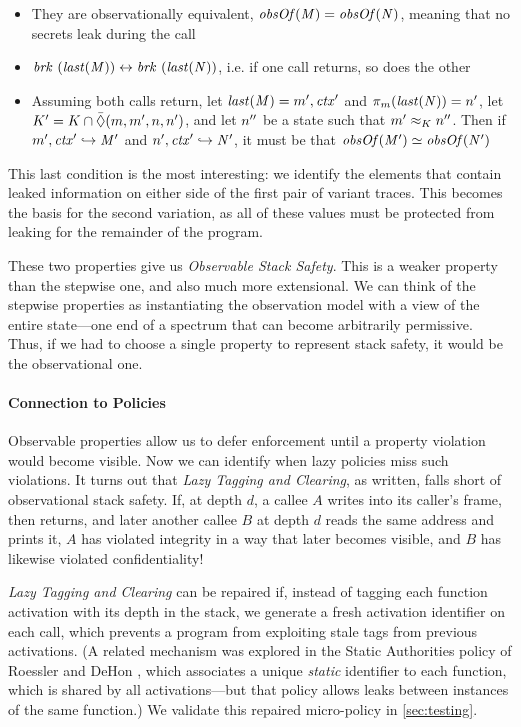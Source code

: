 \documentclass[10pt,conference]{ieeetran}%
\theoremstyle{definition}
\begin{document}
{\begin{itemize}
\item They are observationally equivalent, \(\mathit{obsOf}(\mathit{M}) = \mathit{obsOf}(\mathit{N})\),
  meaning that no secrets leak during the call
\item \(\mathit{brk} ~ (\mathit{last}(\mathit{M})) \leftrightarrow \mathit{brk} ~
(\mathit{last}(\mathit{N}))\), i.e. if one call returns, so does the other
\item Assuming both calls return, let \(\mathit{last}(\mathit{M}) = m',\mathit{ctx}'\)
  and \(\pi_m(\mathit{last}(\mathit{N})) = n'\),
  let \(K' = K \cap \bar{\Diamond}(m,m',n,n')\),
  and let \(n''\) be a state such that \(m' \approx_K n''\).
  Then if \(m',\mathit{ctx}' \hookrightarrow \mathit{M}'\) and
  \(n',\mathit{ctx}' \hookrightarrow \mathit{N}'\), it must be
  that \(\mathit{obsOf}(\mathit{M}') \simeq \mathit{obsOf}(\mathit{N}')\)
\end{itemize}

This last condition is the most interesting: we identify the elements that
contain leaked information on either side of the first pair of variant traces.
This becomes the basis for the second variation, as all of these values
must be protected from leaking for the remainder of the program.

These two properties give us
{\em Observable Stack Safety}. This is a weaker property
than the stepwise one, and also much more extensional.
We can think of the stepwise properties as instantiating
the observation model with a view of the entire state---one end of a
spectrum that can become arbitrarily permissive.
Thus, if we had to choose a single property to represent stack safety,
it would be the observational one.

\medskip
\paragraph*{Connection to Policies}

Observable properties allow us to defer enforcement until a property
violation would become visible. Now we can identify when lazy policies
miss such violations. It turns out that {\em Lazy Tagging and Clearing},
as written, falls short of observational stack safety.
If, at depth \(d\), a callee \(A\) writes into its caller's
frame, then returns, and later another callee \(B\) at depth \(d\) reads the same
address and prints it, \(A\) has violated integrity in a way that later becomes visible,
and \(B\) has likewise violated confidentiality!

{\em Lazy Tagging and Clearing} can be repaired if, instead of tagging each function
activation with its depth in the stack, we generate a fresh activation
identifier on each call, which prevents a program from exploiting stale
tags from previous activations.
(A related mechanism was explored in the
Static Authorities policy of Roessler and DeHon \cite{DBLP:conf/sp/RoesslerD18}, which
associates a unique \emph{static} identifier to each function, which is shared
by all activations---but that policy allows leaks between
instances of the same function.) We validate this repaired micro-policy in
\ref{sec:testing}.

}
\end{document}
